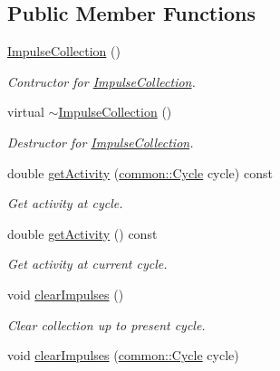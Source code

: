 \subsection*{\-Public \-Member \-Functions}
\begin{DoxyCompactItemize}
\item 
\hyperlink{classcryomesh_1_1components_1_1ImpulseCollection_a230de3cb1f60f8eba8a53237af529ed2}{\-Impulse\-Collection} ()
\begin{DoxyCompactList}\small\item\em \-Contructor for \hyperlink{classcryomesh_1_1components_1_1ImpulseCollection}{\-Impulse\-Collection}. \end{DoxyCompactList}\item 
virtual \hyperlink{classcryomesh_1_1components_1_1ImpulseCollection_a91bdcfc982090f9c665d5d8b80b8d3b9}{$\sim$\-Impulse\-Collection} ()
\begin{DoxyCompactList}\small\item\em \-Destructor for \hyperlink{classcryomesh_1_1components_1_1ImpulseCollection}{\-Impulse\-Collection}. \end{DoxyCompactList}\item 
double \hyperlink{classcryomesh_1_1components_1_1ImpulseCollection_ac9f6be8ecad07258e2c7b25efaa3df70}{get\-Activity} (\hyperlink{classcryomesh_1_1common_1_1Cycle}{common\-::\-Cycle} cycle) const 
\begin{DoxyCompactList}\small\item\em \-Get activity at cycle. \end{DoxyCompactList}\item 
double \hyperlink{classcryomesh_1_1components_1_1ImpulseCollection_acf0a767c00f141a2caee02a36aea6569}{get\-Activity} () const 
\begin{DoxyCompactList}\small\item\em \-Get activity at current cycle. \end{DoxyCompactList}\item 
void \hyperlink{classcryomesh_1_1components_1_1ImpulseCollection_ad465e66e8b49debd309bed6c8ca5bedb}{clear\-Impulses} ()
\begin{DoxyCompactList}\small\item\em \-Clear collection up to present cycle. \end{DoxyCompactList}\item 
void \hyperlink{classcryomesh_1_1components_1_1ImpulseCollection_a07c7c16d3a12c1f65dcb1686578d19da}{clear\-Impulses} (\hyperlink{classcryomesh_1_1common_1_1Cycle}{common\-::\-Cycle} cycle)

\end{DoxyCompactItemize}
